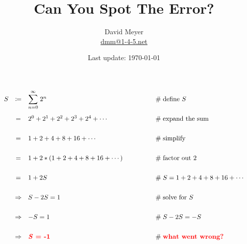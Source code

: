 \documentclass[11pt, oneside]{article}
\title{Can You Spot The Error?}
\author{David Meyer \\ \href{mailto:dmm@1-4-5.net}{dmm@1-4-5.net}}
\date{Last update: \today}
\begin{document}
\maketitle


\bigskip
\Large {
  \begin{equation*}
   \begin{array}{rcll} 
S
&\coloneqq& {\mathlarger \sum\limits_{n = 0}^{\infty}} \; 2^n	&\qquad \qquad \mathrel{\#} \text{define $S$} \\
[18pt]
&=& 2^0 + 2^1 + 2^2 + 2^3 + 2^4 + \cdots 						&\qquad \qquad  \mathrel{\#} \text{expand the sum} \\
[18pt]
&=& 1 + 2 + 4 + 8 + 16 + \cdots 								&\qquad \qquad  \mathrel{\#} \text{simplify} \\
[18pt]
&=& 1 + 2 * (1 + 2 + 4 + 8 + 16 + \cdots)						&\qquad \qquad \mathrel{\#} \text{factor out $2$} \\
[18pt]
&=& 1 + 2S														&\qquad \qquad \mathrel{\#} S = 1 + 2 + 4 + 8 + 16 + \cdots \\
[18pt]
&\Rightarrow& S - 2S = 1										&\qquad \qquad \mathrel{\#} \text{solve for $S$} \\
[18pt]
&\Rightarrow& -S = 1                            				&\qquad \qquad \mathrel{\#} S - 2S = -S \\
[18pt]
&\Rightarrow& \text{\bf \color{red}{\emph{S} = -1}}				&\qquad \qquad \mathrel{\#} \text{{\bf \color{red}{what went wrong?}}}
\end{array}
\end{equation*}
}
\end{document}
